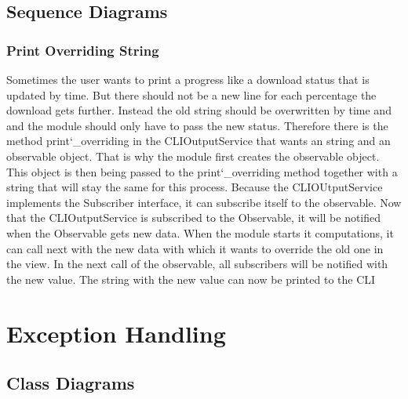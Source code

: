 \documentclass[parskip=full]{scrartcl}
\begin{document}
\newpage

\subsection{Sequence Diagrams}

\subsubsection{Print Overriding String}

\begin{figure}[h]
\begin{center}

\label{Print Overriding String}
\end{center}
\end{figure}
\newpage

Sometimes the user wants to print a progress like a download status that is updated by time.
But there should not be a new line for each percentage the download gets further.
Instead the old string should be overwritten by time and and the module should only have to pass the new status.
Therefore there is the method print\char`_overriding in the CLIOutputService that wants an string and an observable object.
That is why the module first creates the observable object.
This object is then being passed to the print\char`_overriding method together with a string that will stay the same for this process.
Because the CLIOUtputService implements the Subscriber interface, it can subscribe itself to the observable.
Now that the CLIOutputService is subscribed to the Observable, it will be notified when the Observable gets new data.
When the module starts it computations, it can call next with the new data with which it wants to override the old one in the view.
In the next call of the observable, all subscribers will be notified with the new value.
The string with the new value can now be printed to the \gls{CLI}

\newpage

\section{Exception Handling}

\subsection{Class Diagrams}
\end{document}
